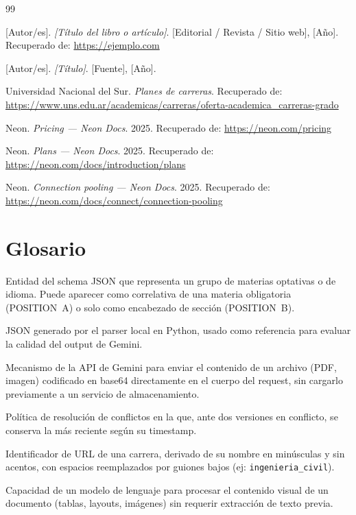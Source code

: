 \documentclass[12pt, a4paper]{report}
\begin{document}
\begin{thebibliography}{99}

[Autor/es].
\textit{[Título del libro o artículo]}.
[Editorial / Revista / Sitio web], [Año].
Recuperado de: \url{https://ejemplo.com}

[Autor/es].
\textit{[Título]}.
[Fuente], [Año].

Universidad Nacional del Sur.
\textit{Planes de carreras}.
Recuperado de: \url{https://www.uns.edu.ar/academicas/carreras/oferta-academica_carreras-grado}

Neon.
\textit{Pricing --- Neon Docs}.
2025.
Recuperado de: \url{https://neon.com/pricing}

Neon.
\textit{Plans --- Neon Docs}.
2025.
Recuperado de: \url{https://neon.com/docs/introduction/plans}

Neon.
\textit{Connection pooling --- Neon Docs}.
2025.
Recuperado de: \url{https://neon.com/docs/connect/connection-pooling}

\end{thebibliography}

\appendix

\chapter{Glosario}
\label{ap:glosario}

\begin{description}[style=nextline]
  \item[Agrupador] Entidad del schema JSON que representa un grupo de materias optativas
        o de idioma. Puede aparecer como correlativa de una materia obligatoria
        (POSITION~A) o solo como encabezado de sección (POSITION~B).
  \item[Ground truth] JSON generado por el parser local en Python, usado como
        referencia para evaluar la calidad del output de Gemini.
  \item[inlineData] Mecanismo de la API de Gemini para enviar el contenido de un
        archivo (PDF, imagen) codificado en base64 directamente en el cuerpo del
        request, sin cargarlo previamente a un servicio de almacenamiento.
  \item[LWW (Last-Write-Wins)] Política de resolución de conflictos en la que,
        ante dos versiones en conflicto, se conserva la más reciente según su
        timestamp.
  \item[Slug] Identificador de URL de una carrera, derivado de su nombre en
        minúsculas y sin acentos, con espacios reemplazados por guiones bajos
        (ej: \texttt{ingenieria\_civil}).
  \item[Visión nativa] Capacidad de un modelo de lenguaje para procesar el
        contenido visual de un documento (tablas, layouts, imágenes) sin requerir
        extracción de texto previa.
\end{description}

\end{document}
